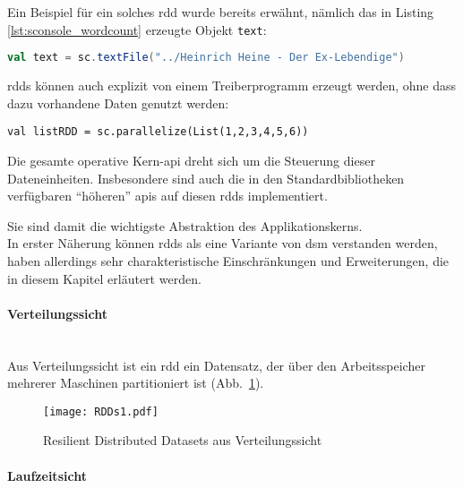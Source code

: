 Ein Beispiel für ein solches \gls{rdd} wurde bereits erwähnt, nämlich das in Listing \ref{lst:sconsole_wordcount} erzeugte Objekt \lstinline|text|:\\

\begin{lstlisting}[language=Scala]
val text = sc.textFile("../Heinrich Heine - Der Ex-Lebendige")
\end{lstlisting}

\Glspl{rdd} können auch explizit von einem Treiberprogramm erzeugt werden, ohne dass dazu vorhandene Daten genutzt werden:\\

\begin{lstlisting}
val listRDD = sc.parallelize(List(1,2,3,4,5,6))
\end{lstlisting}

Die gesamte operative Kern-\gls{api} dreht sich um die Steuerung dieser Dateneinheiten. Insbesondere sind auch die in den Standardbibliotheken verfügbaren "`höheren"' \glspl{api} auf diesen \glspl{rdd} implementiert.

Sie sind damit die wichtigste Abstraktion des Applikationskerns.\\

In erster Näherung können \glspl{rdd} als eine Variante von \gls{dsm}\cite{Nitzberg:1991:DSM:112827.112855} \cite{Mat12} verstanden werden, haben allerdings sehr charakteristische Einschränkungen und Erweiterungen, die in diesem Kapitel erläutert werden.\\

\paragraph{Verteilungssicht}\\

Aus Verteilungssicht ist ein \gls{rdd} ein Datensatz, der über den Arbeitsspeicher mehrerer Maschinen partitioniert ist (Abb.~\ref{fig:rdds1}).

\begin{figure}[ht!]
	\centering
  \texttt{[image: RDDs1.pdf]}
	\caption{Resilient Distributed Datasets aus Verteilungssicht}
	\label{fig:rdds1}
\end{figure}

\paragraph{Laufzeitsicht}\\

